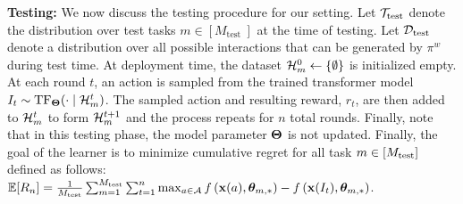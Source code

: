 \textbf{Testing:} We now discuss the testing procedure for our setting. Let $\mathcal{T}_{\text{test}}$ denote the distribution over test tasks $m\in [M_{\text {test }}]$ at the time of testing.
%
Let $\mathcal{D}_{\text{test}}$ denote a distribution over all possible interactions that can be generated by $\pi^w$ during test time. 
%
%
%
%
%
%
At deployment time, the dataset $\mathcal{H}_m^0 \leftarrow \{\emptyset\}$ is initialized empty. At each round $t$, an action is sampled from the trained transformer model $I_t \sim \mathrm{TF}_{\mathbf{\Theta}}(\cdot \mid \mathcal{H}^t_m)$. The sampled action and resulting reward, $r_t$, are then added to $\mathcal{H}^t_m$ to form $\mathcal{H}^{t+1}_m$ and the process repeats for $n$ total rounds.
%
Finally, note that in this testing phase, the model parameter $\mathbf{\Theta}$ is not updated. 
%
Finally, the goal of the learner is to minimize cumulative regret for all task $m\in [M_{\text{test}}]$ defined as follows: 
$
    \mathbb{E}[R_n] = \frac{1}{M_{\text{test}}}\sum_{m=1}^{M_{\text{test}}}\sum_{t=1}^n\max_{a\in\mathcal{A}}f\left( \mathbf{x}(a), \boldsymbol{\theta}_{m,*} \right) - f\left( \mathbf{x}(I_t), \boldsymbol{\theta}_{m,*} \right)$.


\vspace*{-0.5em}

